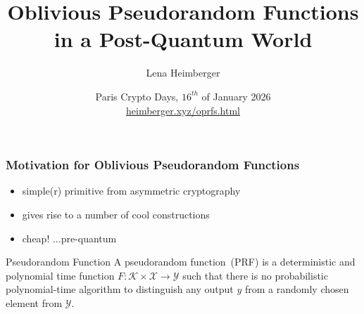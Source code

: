 \documentclass[aspectratio=169, 12pt,handout]{beamer}
\title{Oblivious Pseudorandom Functions in a Post-Quantum World}
\author{Lena Heimberger}
\date{Paris Crypto Days, $16^{th}$ of January 2026\\
\url{heimberger.xyz/oprfs.html}}
\begin{document}
\maketitle

% 


\begin{frame}
  \frametitle{Motivation for Oblivious Pseudorandom Functions}
  \begin{itemize}
    \item simple(r) primitive from asymmetric cryptography\pause
    \item gives rise to a number of cool constructions
    \item cheap! \pause...pre-quantum
  \end{itemize}
  \begin{exampleblock}{Pseudorandom Function}
    A pseudorandom function~(PRF) \cite{C:GolGolMic84,GolGolMic86} is a
    deterministic and polynomial time function $F \colon
    \mathcal{K}\times\mathcal{X}\rightarrow \mathcal{Y}$ such that
    there is no probabilistic polynomial-time algorithm
    to distinguish any output $y$ from a randomly chosen element from
    $\mathcal{Y}$.
    \label{def:prf}
  \end{exampleblock}
\end{frame}
\end{document}

